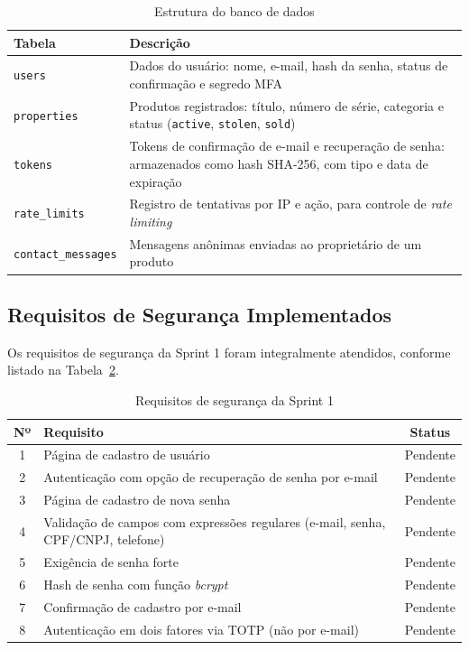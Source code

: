 \documentclass[12pt,a4paper]{article}
\begin{document}
\begin{table}[H]
  \centering
  \caption{Estrutura do banco de dados}
  \label{tab:banco}
  \small
  \begin{tabularx}{\textwidth}{|l|X|}
    \hline
    \textbf{Tabela} & \textbf{Descrição} \\
    \hline
    \texttt{users} & Dados do usuário: nome, e-mail, hash da senha, status de confirmação e segredo MFA \\
    \hline
    \texttt{properties} & Produtos registrados: título, número de série, categoria e status (\texttt{active}, \texttt{stolen}, \texttt{sold}) \\
    \hline
    \texttt{tokens} & Tokens de confirmação de e-mail e recuperação de senha: armazenados como hash SHA-256, com tipo e data de expiração \\
    \hline
    \texttt{rate\_limits} & Registro de tentativas por IP e ação, para controle de \textit{rate limiting} \\
    \hline
    \texttt{contact\_messages} & Mensagens anônimas enviadas ao proprietário de um produto \\
    \hline
  \end{tabularx}
\end{table}

\subsection{Requisitos de Segurança Implementados}

Os requisitos de segurança da Sprint 1 foram integralmente atendidos, conforme listado na Tabela~\ref{tab:requisitos}.

\begin{table}[H]
  \centering
  \caption{Requisitos de segurança da Sprint 1}
  \label{tab:requisitos}
  \small
  \begin{tabularx}{\textwidth}{|c|X|c|}
    \hline
    \textbf{Nº} & \textbf{Requisito} & \textbf{Status} \\
    \hline
    1 & Página de cadastro de usuário & Pendente \\
    \hline
    2 & Autenticação com opção de recuperação de senha por e-mail & Pendente \\
    \hline
    3 & Página de cadastro de nova senha & Pendente \\
    \hline
    4 & Validação de campos com expressões regulares (e-mail, senha, CPF/CNPJ, telefone) & Pendente \\
    \hline
    5 & Exigência de senha forte & Pendente \\
    \hline
    6 & Hash de senha com função \textit{bcrypt} & Pendente \\
    \hline
    7 & Confirmação de cadastro por e-mail & Pendente \\
    \hline
    8 & Autenticação em dois fatores via TOTP (não por e-mail) & Pendente \\
    \hline
  \end{tabularx}
\end{table}
\end{document}
